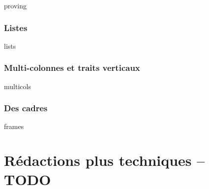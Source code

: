\documentclass[14pt]{memoir}
\begin{document}
{proving}




\section{Listes}

{lists}




\section{Multi-colonnes et traits verticaux}

{multicols}




\section{Des cadres}

{frames}




\part{Rédactions plus techniques -- TODO}

%
%
%
%
%
%
%
%
%
%
%
%
%
%
%
%
%
\end{document}
